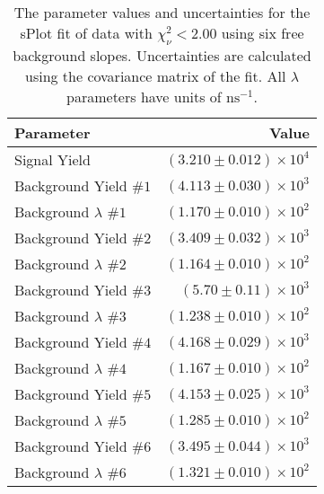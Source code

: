 
\begin{table}[ht]
    \begin{center}
        \begin{tabular}{lr}\toprule
            Parameter & Value \\\midrule
            Signal Yield & $(3.210 \pm 0.012) \times 10^{4}$ \\
            Background Yield $\#1$ & $(4.113 \pm 0.030) \times 10^{3}$ \\
            Background $\lambda$ $\#1$ & $(1.170 \pm 0.010) \times 10^{2}$ \\
            Background Yield $\#2$ & $(3.409 \pm 0.032) \times 10^{3}$ \\
            Background $\lambda$ $\#2$ & $(1.164 \pm 0.010) \times 10^{2}$ \\
            Background Yield $\#3$ & $(5.70 \pm 0.11) \times 10^{3}$ \\
            Background $\lambda$ $\#3$ & $(1.238 \pm 0.010) \times 10^{2}$ \\
            Background Yield $\#4$ & $(4.168 \pm 0.029) \times 10^{3}$ \\
            Background $\lambda$ $\#4$ & $(1.167 \pm 0.010) \times 10^{2}$ \\
            Background Yield $\#5$ & $(4.153 \pm 0.025) \times 10^{3}$ \\
            Background $\lambda$ $\#5$ & $(1.285 \pm 0.010) \times 10^{2}$ \\
            Background Yield $\#6$ & $(3.495 \pm 0.044) \times 10^{3}$ \\
            Background $\lambda$ $\#6$ & $(1.321 \pm 0.010) \times 10^{2}$ \\\bottomrule
        \end{tabular}
        \caption{The parameter values and uncertainties for the sPlot fit of data with $\chi^2_\nu < 2.00$ using six free background slopes. Uncertainties are calculated using the covariance matrix of the fit. All $\lambda$ parameters have units of $\si{\nano\second}^{-1}$.}\label{tab:splot-fit-results-chisqdof-2.00-free-6}
    \end{center}
\end{table}
